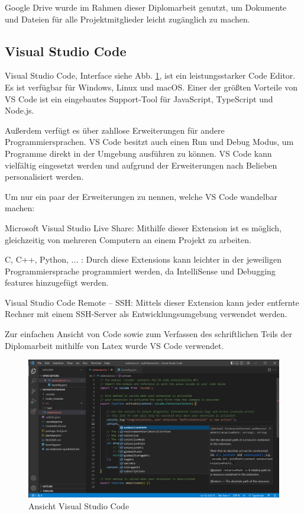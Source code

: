 Google Drive wurde im Rahmen dieser Diplomarbeit genutzt, um Dokumente und Dateien für alle Projektmitglieder leicht zugänglich zu machen.


\subsection{Visual Studio Code } 
Visual Studio Code, Interface siehe Abb. \ref{fig:impl:vsCode}, ist ein leistungsstarker Code Editor. Es ist verfügbar für Windows, Linux und macOS.
Einer der größten Vorteile von VS Code ist ein eingebautes Support-Tool für JavaScript, TypeScript und Node.js. 

Außerdem verfügt es über zahllose Erweiterungen für andere Programmiersprachen. VS Code besitzt auch einen Run und Debug Modus, um Programme direkt in der Umgebung ausführen zu können.
VS Code kann vielfältig eingesetzt werden und aufgrund der Erweiterungen nach Belieben personalisiert werden. \cite{VSCodeOfficialSite}


Um nur ein paar der Erweiterungen zu nennen, welche VS Code wandelbar machen:


\begin{compactitem}
\item Microsoft Visual Studio Live Share: Mithilfe dieser Extension ist es möglich, gleichzeitig von mehreren Computern an einem Projekt zu arbeiten.
\item C, C++, Python, ... : Durch diese Extensions kann leichter in der jeweiligen Programmiersprache programmiert werden, da IntelliSense und Debugging features hinzugefügt werden.
\item Visual Studio Code Remote – SSH: Mittels dieser Extension kann jeder entfernte Rechner mit einem SSH-Server als Entwicklungsumgebung verwendet werden.
\end{compactitem}
\cite{VSCodeOfficialSite}


Zur einfachen Ansicht von Code sowie zum Verfassen des schriftlichen Teils der Diplomarbeit mithilfe von Latex wurde VS Code verwendet.


\begin{figure}[h t]
\centering
\includegraphics[scale=0.48]{pics/visualStudioCode.png}
\caption{Ansicht Visual Studio Code}
\label{fig:impl:vsCode}
\end{figure}


